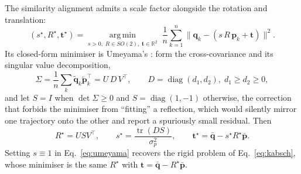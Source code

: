 The similarity alignment admits a scale factor alongside the rotation and
translation:
\begin{equation}
(s^{\star},R^{\star},\mathbf{t}^{\star})=
\operatorname*{arg\,min}_{s>0,\;R\in SO(2),\;\mathbf{t}\in\mathbb{R}^{2}}
\;\frac1n\sum_{k=1}^{n}
\bigl\lVert \mathbf{q}_k-(s\,R\,\mathbf{p}_k+\mathbf{t})\bigr\rVert^{2}.
\label{eq:umeyama}
\end{equation}
Its closed-form minimiser is Umeyama's \cite{umeyama1991}: form the
cross-covariance and its singular value decomposition,
\begin{equation}
\Sigma=\frac1n\sum_k\tilde{\mathbf{q}}_k\tilde{\mathbf{p}}_k^{\top}
      = U\,D\,V^{\top},\qquad D=\operatorname{diag}(d_1,d_2),\;d_1\ge d_2\ge 0,
\label{eq:crosscov}
\end{equation}
and let $S=I$ when $\det\Sigma\ge 0$ and $S=\operatorname{diag}(1,-1)$
otherwise, the correction that forbids the minimiser from ``fitting'' a
reflection, which would silently mirror one trajectory onto the other and
report a spuriously small residual. Then
\begin{equation}
R^{\star}=U S V^{\top},\qquad
s^{\star}=\frac{\operatorname{tr}(DS)}{\sigma_p^{2}},\qquad
\mathbf{t}^{\star}=\bar{\mathbf{q}}-s^{\star}R^{\star}\bar{\mathbf{p}} .
\label{eq:umeyamasol}
\end{equation}
Setting $s\equiv1$ in Eq.~\ref{eq:umeyama} recovers the rigid problem of
Eq.~\ref{eq:kabsch}, whose minimiser is the same $R^{\star}$ with
$\mathbf{t}=\bar{\mathbf{q}}-R^{\star}\bar{\mathbf{p}}$.

